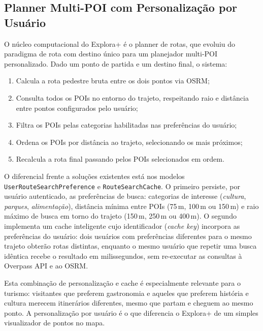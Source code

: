 \documentclass[12pt, a4paper]{article}
\begin{document}
\subsection{Planner Multi-POI com Personaliza\c{c}\~ao por Usu\'ario}

O n\'ucleo computacional do Explora+ \'e o planner de rotas, que evoluiu do paradigma de rota com destino \'unico para um planejador multi-POI personalizado. Dado um ponto de partida e um destino final, o sistema:

\begin{enumerate}
  \item Calcula a rota pedestre bruta entre os dois pontos via OSRM;
  \item Consulta todos os POIs no entorno do trajeto, respeitando raio e dist\^ancia entre pontos configurados pelo usu\'ario;
  \item Filtra os POIs pelas categorias habilitadas nas prefer\^encias do usu\'ario;
  \item Ordena os POIs por dist\^ancia ao trajeto, selecionando os mais pr\'oximos;
  \item Recalcula a rota final passando pelos POIs selecionados em ordem.
\end{enumerate}

{\sloppy
O diferencial frente a solu\c{c}\~oes existentes est\'a nos modelos \texttt{User\-Route\-Search\-Preference} e \texttt{Route\-Search\-Cache}. O primeiro persiste, por usu\'ario autenticado, as prefer\^encias de busca: categorias de interesse (\textit{cultura}, \textit{parques}, \textit{alimenta\c{c}\~ao}), dist\^ancia m\'inima entre POIs (75\,m, 100\,m ou 150\,m) e raio m\'aximo de busca em torno do trajeto (150\,m, 250\,m ou 400\,m). O segundo implementa um cache inteligente cujo identificador (\textit{cache key}) incorpora as prefer\^encias do usu\'ario: dois usu\'arios com prefer\^encias diferentes para o mesmo trajeto obter\~ao rotas distintas, enquanto o mesmo usu\'ario que repetir uma busca id\^entica recebe o resultado em milissegundos, sem re-executar as consultas \`a Overpass API e ao OSRM.
\par}

Esta combina\c{c}\~ao de personaliza\c{c}\~ao e cache \'e especialmente relevante para o turismo: visitantes que preferem gastronomia e aqueles que preferem hist\'oria e cultura merecem itiner\'arios diferentes, mesmo que partam e cheguem ao mesmo ponto. A personaliza\c{c}\~ao por usu\'ario \'e o que diferencia o Explora+ de um simples visualizador de pontos no mapa.
\end{document}
